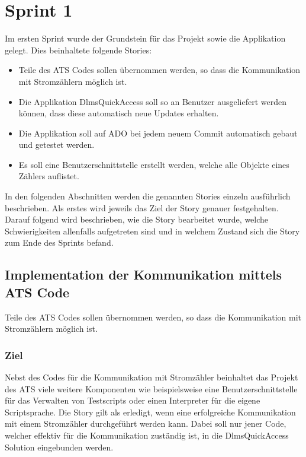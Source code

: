 \section{Sprint 1}
Im ersten Sprint wurde der Grundstein für das Projekt sowie die Applikation gelegt.
Dies beinhaltete folgende Stories:
\begin{itemize}
   \item Teile des \ac{ATS} Codes sollen übernommen werden, so dass die Kommunikation mit Stromzählern möglich ist.
   \item Die Applikation DlmsQuickAccess soll so an Benutzer ausgeliefert werden können, dass diese automatisch neue Updates erhalten.
   \item Die Applikation soll auf \ac{ADO} bei jedem neuem Commit automatisch gebaut und getestet werden. 
   \item Es soll eine Benutzerschnittstelle erstellt werden, welche alle Objekte eines Zählers auflistet.
\end{itemize}
In den folgenden Abschnitten werden die genannten Stories einzeln ausführlich beschrieben.
Als erstes wird jeweils das Ziel der Story genauer festgehalten.
Darauf folgend wird beschrieben, wie die Story bearbeitet wurde, welche Schwierigkeiten allenfalls aufgetreten sind und in welchem Zustand sich die Story zum Ende des Sprints befand.

\subsection{Implementation der Kommunikation mittels ATS Code}\label{s1:ats}
\dq Teile des \ac{ATS} Codes sollen übernommen werden, so dass die Kommunikation mit Stromzählern möglich ist.\dq

\subsubsection{Ziel}
Nebst des Codes für die Kommunikation mit Stromzähler beinhaltet das Projekt des \ac{ATS} viele weitere Komponenten wie beispielsweise eine Benutzerschnittstelle für das Verwalten von Testscripts oder einen Interpreter für die eigene Scriptsprache.
Die Story gilt als erledigt, wenn eine erfolgreiche Kommunikation mit einem Stromzähler durchgeführt werden kann.
Dabei soll nur jener Code, welcher effektiv für die Kommunikation zuständig ist, in die DlmsQuickAccess Solution eingebunden werden. 


